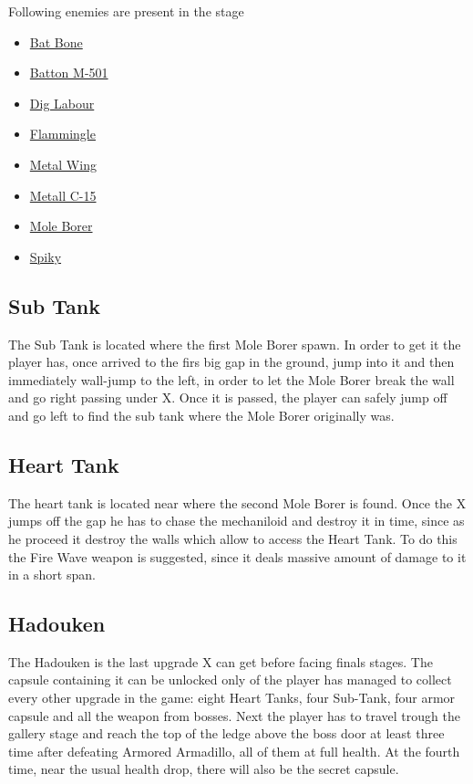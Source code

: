 Following enemies are present in the stage\cite{wiki:Gallery}
\begin{itemize}
	\item \hyperlink{enem:Bat_Bone}{Bat Bone} 
	\item \hyperlink{enem:Batton_M-501}{Batton M-501} 
	\item \hyperlink{enem:Dig_Labour}{Dig Labour} 
	\item \hyperlink{enem:Flammingle}{Flammingle} 
	\item \hyperlink{enem:Metal_Wing}{Metal Wing} 
	\item \hyperlink{enem:Metall_C-15}{Metall C-15} 
	\item \hyperlink{miniboss:Mole_Borer}{Mole Borer}
	\item \hyperlink{enem:Spiky}{Spiky}
\end{itemize}

\subsection{Sub Tank}
The Sub Tank is located where the first Mole Borer spawn. In order to get it the player has, once arrived to the firs big gap in the ground, jump into it and then immediately wall-jump to the left, in order to let the Mole Borer break the wall and go right passing under X. Once it is passed, the player can safely jump off and go left to find the sub tank where the Mole Borer originally was. 

\subsection{Heart Tank}
The heart tank is located near where the second Mole Borer is found. Once the X jumps off the gap he has to chase the mechaniloid and destroy it in time, since as he proceed it destroy the walls which allow to access the Heart Tank. To do this the Fire Wave weapon is suggested, since it deals massive amount of damage to it in a short span. 

\subsection{Hadouken}\label{Hadouken}
The Hadouken is the last upgrade X can get before facing finals stages. The capsule containing it can be unlocked only of the player has managed to collect every other upgrade in the game: eight Heart Tanks, four Sub-Tank, four armor capsule and all the weapon from bosses. Next the player has to travel trough the gallery stage and reach the top of the ledge above the boss door at least three time after defeating Armored Armadillo, all of them at full health. At the fourth time, near the usual health drop, there will also be the secret capsule.

